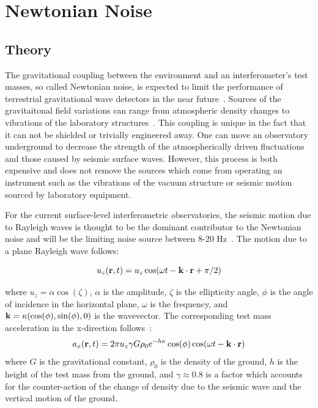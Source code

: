 \documentclass [12pt, proquest]{uwthesis}[2019]
\begin{document}
\section{Newtonian Noise}
\subsection{Theory}

The gravitational coupling between the environment and an interferometer's test masses, so called Newtonian noise, is expected to limit the performance of terrestrial gravitational wave detectors in the near future~\cite{Saulson}. Sources of the gravitaitonal field variations can range from atmospheric density changes to vibrations of the laboratory structures~\cite{terrestrial}. This coupling is unique in the fact that it can not be shielded or trivially engineered away. One can move an observatory underground to decrease the strength of the atmospherically driven fluctuations and those caused by seismic surface waves. However, this process is both expensive and does not remove the sources which come from operating an instrument such as the vibrations of the vacuum structure or seismic motion sourced by laboratory equipment. 

For the current surface-level interferometric observatories, the seismic motion due to Rayleigh waves is thought to be the dominant contributor to the Newtonian noise and will be the limiting noise source between 8-20 Hz~\cite{NN2}. The motion due to a plane Rayleigh wave follows:

\begin{equation}
u_z({\bf r} ,t)=u_z \cos(\omega t-{\bf k}\cdot{\bf r}+\pi/2) \label{uz}
\end{equation}

where $u_z=\alpha \cos(\zeta)$, $\alpha$ is the amplitude, $\zeta$ is the ellipticity angle, $\phi$ is the angle of incidence in the horizontal plane, $\omega$ is the frequency, and $\bf{k}=\kappa (\cos(\phi),\sin(\phi),\text{0})$ is the wavevector. The corresponding test mass acceleration in the x-direction follows~\cite{Harms_2016}:
\begin{equation}
a_x({\bf r} ,t)=2 \pi u_z \gamma G \rho_0 e^{-h \kappa}  \cos(\phi) \cos(\omega t-{\bf k}\cdot{\bf r}) \label{a}
\end{equation}
where $G$ is the gravitational constant, $\rho_0$ is the density of the ground, $h$ is the height of the test mass from the ground, and $\gamma \approx 0.8$ is a factor which accounts for the counter-action of the change of density due to the seismic wave and the vertical motion of the ground.
\end{document}
